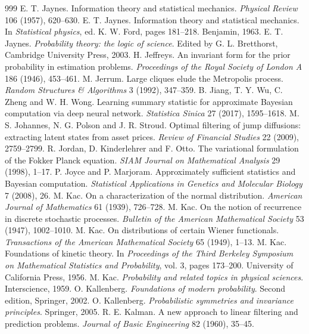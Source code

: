 \begin{thebibliography}{999}
 E. T. Jaynes. Information theory and statistical mechanics. \emph{Physical Review} 106 (1957), 620--630.
 E. T. Jaynes. Information theory and statistical mechanics. In \emph{Statistical physics}, ed. K. W. Ford, pages 181--218. Benjamin, 1963.
 E. T. Jaynes. \emph{Probability theory: the logic of science}. Edited by G. L. Bretthorst, Cambridge University Press, 2003.
 H. Jeffreys. An invariant form for the prior probability in estimation problems. \emph{Proceedings of the Royal Society of London A} 186 (1946), 453--461.
 M. Jerrum. Large cliques elude the Metropolis process. \emph{Random Structures \& Algorithms} 3 (1992), 347--359.
 B. Jiang, T. Y. Wu, C. Zheng and W. H. Wong. Learning summary statistic for approximate Bayesian computation via deep neural network. \emph{Statistica Sinica} 27 (2017), 1595--1618.
 M. S. Johannes, N. G. Polson and J. R. Stroud. Optimal filtering of jump diffusions: extracting latent states from asset prices. \emph{Review of Financial Studies} 22 (2009), 2759--2799.
 R. Jordan, D. Kinderlehrer and F. Otto. The variational formulation of the Fokker Planck equation. \emph{SIAM Journal on Mathematical Analysis} 29 (1998), 1--17.
 P. Joyce and P. Marjoram. Approximately sufficient statistics and Bayesian computation. \emph{Statistical Applications in Genetics and Molecular Biology} 7 (2008), 26.
 M. Kac. On a characterization of the normal distribution. \emph{American Journal of Mathematics} 61 (1939), 726--728.
 M. Kac. On the notion of recurrence in discrete stochastic processes. \emph{Bulletin of the American Mathematical Society} 53 (1947), 1002--1010.
 M. Kac. On distributions of certain Wiener functionals. \emph{Transactions of the American Mathematical Society} 65 (1949), 1--13.
 M. Kac. Foundations of kinetic theory. In \emph{Proceedings of the Third Berkeley Symposium on Mathematical Statistics and Probability}, vol. 3, pages 173--200. University of California Press, 1956.
 M. Kac. \emph{Probability and related topics in physical sciences}. Interscience, 1959.
 O. Kallenberg. \emph{Foundations of modern probability}. Second edition, Springer, 2002.
 O. Kallenberg. \emph{Probabilistic symmetries and invariance principles}. Springer, 2005.
 R. E. Kalman. A new approach to linear filtering and prediction problems. \emph{Journal of Basic Engineering} 82 (1960), 35--45.

\end{thebibliography}

